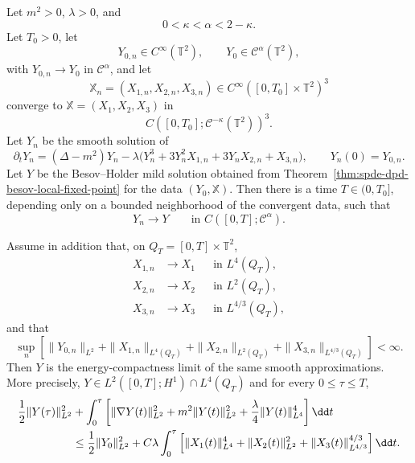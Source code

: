 \begin{proposition}
\label{prop:spde-dpd-besov-energy-compatibility}
Let \(m^2>0\), \(\lambda>0\), and
\[
  0<\kappa<\alpha<2-\kappa .
\]
Let \(T_0>0\), let
\[
  Y_{0,n}\in C^\infty(\mathbb T^2),
  \qquad
  Y_0\in\mathcal C^\alpha(\mathbb T^2),
\]
with \(Y_{0,n}\to Y_0\) in \(\mathcal C^\alpha\), and let
\[
  \mathbb X_n=(X_{1,n},X_{2,n},X_{3,n})
  \in C^\infty([0,T_0]\times\mathbb T^2)^3
\]
converge to
\(\mathbb X=(X_1,X_2,X_3)\) in
\[
  C([0,T_0];\mathcal C^{-\kappa}(\mathbb T^2))^3 .
\]
Let \(Y_n\) be the smooth solution of
\[
  \partial_tY_n
  =
  (\Delta-m^2)Y_n
  -\lambda\bigl(
    Y_n^3+3Y_n^2X_{1,n}+3Y_nX_{2,n}+X_{3,n}
  \bigr),
  \qquad
  Y_n(0)=Y_{0,n}.
\]
Let \(Y\) be the Besov--Holder mild solution obtained from
Theorem~\ref{thm:spde-dpd-besov-local-fixed-point} for the data
\((Y_0,\mathbb X)\).  Then there is a time \(T\in(0,T_0]\), depending only
on a bounded neighborhood of the convergent data, such that
\begin{equation}
  Y_n\longrightarrow Y
  \qquad\text{in }C([0,T];\mathcal C^\alpha).
  \label{eq:spde-dpd-besov-energy-compatibility-local-convergence}
\end{equation}

Assume in addition that, on \(Q_T=[0,T]\times\mathbb T^2\),
\[
\begin{aligned}
  X_{1,n}&\to X_1
    &&\text{in }L^4(Q_T),\\
  X_{2,n}&\to X_2
    &&\text{in }L^2(Q_T),\\
  X_{3,n}&\to X_3
    &&\text{in }L^{4/3}(Q_T),
\end{aligned}
\]
and that
\[
  \sup_n
  \left[
    \|Y_{0,n}\|_{L^2}
    +\|X_{1,n}\|_{L^4(Q_T)}
    +\|X_{2,n}\|_{L^2(Q_T)}
    +\|X_{3,n}\|_{L^{4/3}(Q_T)}
  \right]
  <\infty .
\]
Then \(Y\) is the energy-compactness limit of the same smooth
approximations.  More precisely, \(Y\in L^2([0,T];H^1)\cap L^4(Q_T)\) and
for every \(0\leq\tau\leq T\),
\begin{align}
  \frac12\|Y(\tau)\|_{L^2}^2
  &+
  \int_0^\tau
  \left[
    \|\nabla Y(t)\|_{L^2}^2
    +m^2\|Y(t)\|_{L^2}^2
    +\frac{\lambda}{4}\|Y(t)\|_{L^4}^4
  \right]\dd t
  \notag\\
  &\leq
  \frac12\|Y_0\|_{L^2}^2
  +
  C\lambda
  \int_0^\tau
  \left[
    \|X_1(t)\|_{L^4}^4
    +\|X_2(t)\|_{L^2}^2
    +\|X_3(t)\|_{L^{4/3}}^{4/3}
  \right]\dd t .
  \label{eq:spde-dpd-besov-energy-compatibility-energy}
\end{align}
\end{proposition}

